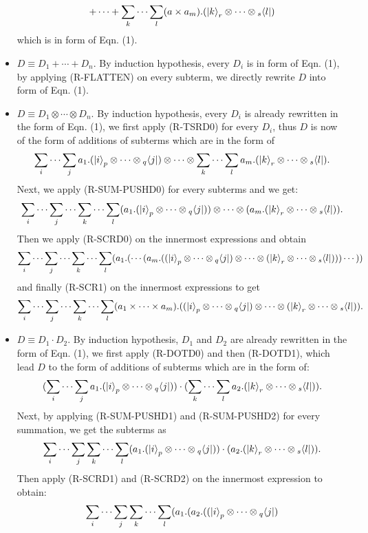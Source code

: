 \documentclass[runningheads]{llncs}
\def\<{\ensuremath{\langle}}
\begin{document}
\begin{itemize}
$$  + \cdots +
  \sum_{k}\cdots\sum_{l} (a \times a_m) . (\ket{k}_{r} \otimes \cdots \otimes {}_s\<l|)$$
  which is in form of Eqn. (1).
  \item $D \equiv D_1 + \cdots + D_n$. By induction hypothesis, every $D_i$ is in form of Eqn. (1), by applying (R-FLATTEN) on every subterm, we directly rewrite $D$ into form of Eqn. (1).
  \item $D \equiv D_1\otimes \cdots \otimes D_n$. By induction hypothesis, every $D_i$ is already rewritten in the form of Eqn. (1), we first apply (R-TSRD0) for every $D_i$, thus $D$ is now of the form of additions of subterms which are in the form of 
  $$
  \sum_{i}\cdots\sum_{j} a_1 . (\ket{i}_{p} \otimes \cdots \otimes {}_q\<j|)
  \otimes \cdots \otimes
  \sum_{k}\cdots\sum_{l} a_m . (\ket{k}_{r} \otimes \cdots \otimes {}_s\<l|).
  $$
  Next, we apply (R-SUM-PUSHD0) for every subterms and we get:
  $$
  \sum_{i}\cdots\sum_{j}\cdots\sum_{k}\cdots\sum_{l} (a_1 . (\ket{i}_{p} \otimes \cdots \otimes {}_q\<j|))
  \otimes \cdots \otimes
  (a_m . (\ket{k}_{r} \otimes \cdots \otimes {}_s\<l|)).
  $$
  Then we apply (R-SCRD0) on the innermost expressions and obtain
  $$
  \sum_{i}\cdots\sum_{j}\cdots\sum_{k}\cdots\sum_{l} (a_1.( \cdots (a_m . ((\ket{i}_{p} \otimes \cdots \otimes {}_q\<j|)
  \otimes \cdots \otimes
  (\ket{k}_{r} \otimes \cdots \otimes {}_s\<l|))) \cdots ))
  $$
  and finally (R-SCR1) on the innermost expressions to get
  $$
  \sum_{i}\cdots\sum_{j}\cdots\sum_{k}\cdots\sum_{l} (a_1\times \cdots \times a_m) . ((\ket{i}_{p} \otimes \cdots \otimes {}_q\<j|)
  \otimes \cdots \otimes
  (\ket{k}_{r} \otimes \cdots \otimes {}_s\<l|)).
  $$
  \item $D \equiv D_1 \cdot D_2$. By induction hypothesis, $D_1$ and $D_2$ are already rewritten in the form of Eqn. (1), we first apply (R-DOTD0) and then (R-DOTD1), which lead $D$ to the form of additions of subterms which are in the form of:
  $$
  (\sum_{i}\cdots\sum_{j} a_1 . (\ket{i}_{p} \otimes \cdots \otimes {}_q\<j|))
  \cdot  
  (\sum_{k}\cdots\sum_{l} a_2 . (\ket{k}_{r} \otimes \cdots \otimes {}_s\<l|)).
  $$
  Next, by applying (R-SUM-PUSHD1) and (R-SUM-PUSHD2) for every summation, we get the subterms as
  $$
  \sum_{i}\cdots\sum_{j}\sum_{k}\cdots\sum_{l} (a_1 . (\ket{i}_{p} \otimes \cdots \otimes {}_q\<j|))
  \cdot  
  (a_2 . (\ket{k}_{r} \otimes \cdots \otimes {}_s\<l|)).
  $$
  Then apply (R-SCRD1) and (R-SCRD2) on the innermost expression to obtain:
  $$
  \sum_{i}\cdots\sum_{j}\sum_{k}\cdots\sum_{l} (a_1 . (a_2. ((\ket{i}_{p} \otimes \cdots \otimes {}_q\<j|)
$$
\end{itemize}
\end{document}
